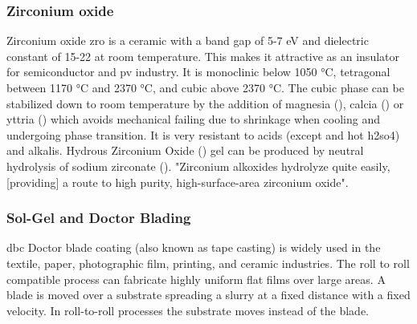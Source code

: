 \subsubsection{Zirconium oxide}
Zirconium oxide \gls{zro} is a ceramic with a band gap of 5-7 eV and dielectric constant of 15-22 at room temperature\cite{Anwar2017}. 
This makes it attractive as an insulator for semiconductor and \gls{pv} industry. 
It is monoclinic below 1050 °C, tetragonal between 1170 °C and 2370 °C, and cubic above 2370 °C\cite{Nielsen2005}.
The cubic phase can be stabilized down to room temperature by the addition of magnesia (), calcia () or yttria () which avoids mechanical failing due to shrinkage 
when cooling and undergoing phase transition\cite{Nielsen2005}.
It is very resistant to acids (except  and hot \gls{h2so4}) and alkalis\cite{Nielsen2005}.
Hydrous Zirconium Oxide () gel can be produced by neutral hydrolysis of sodium zirconate (). 
"Zirconium alkoxides hydrolyze quite easily, [providing] a route to high purity, high-surface-area zirconium oxide"\cite{Nielsen2005}.

\subsubsection{Sol-Gel and Doctor Blading}
%
\Gls{dbc} Doctor blade coating (also known as tape casting) is widely used in the textile, paper, photographic film, printing, and ceramic industries.
The roll to roll compatible process can fabricate highly uniform flat films over large areas\cite{yang2010large}.
A blade is moved over a substrate spreading a slurry at a fixed distance with a fixed velocity.
In roll-to-roll processes the substrate moves instead of the blade. 

